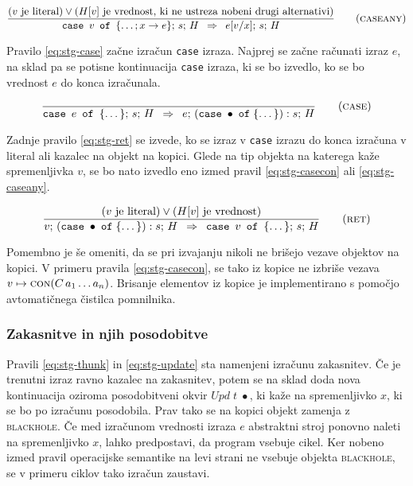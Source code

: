 \begin{equation}
	\infer[caseany]{
		(\text{$v$ je literal}) \lor (\text{$H[v]$ je vrednost, ki ne ustreza nobeni drugi alternativi})
	}{
		\texttt{case} \enspace v \enspace \texttt{of} \enspace \{ \dots; x \to e \}; \, s; \, H
	}{
		e[v/x]; \, s; \, H
	}
 \label{eq:stg-caseany}
\end{equation}

Pravilo \ref{eq:stg-case} začne izračun \texttt{case} izraza. Najprej se začne računati izraz $e$, na sklad pa se potisne kontinuacija \texttt{case} izraza, ki se bo izvedlo, ko se bo vrednost $e$ do konca izračunala.

\begin{equation}
	\infer[case]{}{
		\texttt{case} \enspace e \enspace \texttt{of} \enspace \{ \dots \}; \, s; \, H
	}{
		e; \, (\texttt{case} \; \bullet \; \texttt{of} \; \{ \dots \}) : s; \, H
	}
\label{eq:stg-case}
\end{equation}

Zadnje pravilo \ref{eq:stg-ret} se izvede, ko se izraz v \texttt{case} izrazu do konca izračuna v literal ali kazalec na objekt na kopici. Glede na tip objekta na katerega kaže spremenljivka $v$, se bo nato izvedlo eno izmed pravil \ref{eq:stg-casecon} ali \ref{eq:stg-caseany}.

\begin{equation}
	\infer[ret]{
		(\text{$v$ je literal}) \lor (\text{$H[v]$ je vrednost})
	}{
		v; \, (\texttt{case} \; \bullet \; \texttt{of} \; \{ \dots \}) : s; \, H
	}{
		\texttt{case} \enspace v \enspace \texttt{of} \enspace \{ \dots \}; \, s; \, H
	}
\label{eq:stg-ret}
\end{equation}

Pomembno je še omeniti, da se pri izvajanju nikoli ne brišejo vezave objektov na kopici. V primeru pravila \ref{eq:stg-casecon}, se tako iz kopice ne izbriše vezava $v \mapsto \textsc{con}(C \, a_1 \dots a_n)$. Brisanje elementov iz kopice je implementirano s pomočjo avtomatičnega čistilca pomnilnika.

\subsubsection{Zakasnitve in njih posodobitve}

Pravili \ref{eq:stg-thunk} in \ref{eq:stg-update} sta namenjeni izračunu zakasnitev. Če je trenutni izraz ravno kazalec na zakasnitev, potem se na sklad doda nova kontinuacija oziroma posodobitveni okvir $\textit{Upd} \; t \; \bullet$, ki kaže na spremenljivko $x$, ki se bo po izračunu posodobila. Prav tako se na kopici objekt zamenja z \textsc{blackhole}. Če med izračunom vrednosti izraza $e$ abstraktni stroj ponovno naleti na spremenljivko $x$, lahko predpostavi, da program vsebuje cikel. Ker nobeno izmed pravil operacijske semantike na levi strani ne vsebuje objekta \textsc{blackhole}, se v primeru ciklov tako izračun zaustavi.

